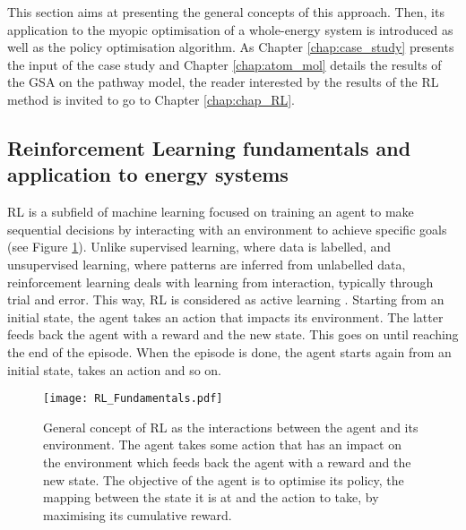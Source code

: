 This section aims at presenting the general concepts of this approach. Then, its application to the myopic optimisation of a whole-energy system is introduced as well as the policy optimisation algorithm. As Chapter \ref{chap:case_study} presents the input of the case study and Chapter \ref{chap:atom_mol} details the results of the \gls{GSA} on the pathway model, the reader interested by the results of the \gls{RL} method is invited to go to Chapter \ref{chap:chap_RL}.

\subsection[Reinforcement Learning fundamentals]{Reinforcement Learning fundamentals and application to energy systems}
\label{subsec:meth_RL_fundamentals}

\Gls{RL} is a subfield of machine learning focused on training an agent to make sequential decisions by interacting with an environment to achieve specific goals (see Figure \ref{fig:RL_Fundamentals}). Unlike supervised learning, where data is labelled, and unsupervised learning, where patterns are inferred from unlabelled data, reinforcement learning deals with learning from interaction, typically through trial and error. This way, \gls{RL} is considered as active learning \cite{cao2020reinforcement}. Starting from an initial state, the agent takes an action that impacts its environment. The latter feeds back the agent with a reward and the new state. This goes on until reaching the end of the episode. When the episode is done, the agent starts again from an initial state, takes an action and so on. 

\begin{figure}[!htbp]
\centering
\texttt{[image: RL\_Fundamentals.pdf]}
\caption{General concept of \acrfull{RL} as the interactions between the agent and its environment. The agent takes some action that has an impact on the environment which feeds back the agent with a reward and the new state. The objective of the agent is to optimise its policy, \ie the mapping between the state it is at and the action to take, by maximising its cumulative reward.}
\label{fig:RL_Fundamentals}
\end{figure}

